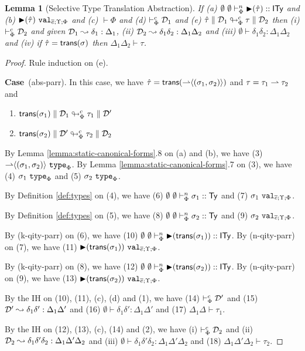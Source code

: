 \documentclass[12pt]{article}
\newtheorem{lemma}{Lemma}
\newcommand{\pfcase}[1]{\textbf{Case}~#1. }
\begin{document}
\begin{lemma}[Selective Type Translation Abstraction]
\label{lemma:selective-type-translation-abstraction}
If (a) $\sofkVX{\sqity{\qity}}{\kity}$ and (b) $\sval{\sqity{\qity}}{\es;\Upsilon;\Phi}$ and (c) $\vdash \Phi$ and (d) $\tytsvX{\memD_1}$ and (e) $\tdeabs{\Phi}{c}{\qity}{\memD_1}{\ity}{\memD_2}$ then (i) $\tytsvX{\memD_2}$ and given $\memD_1 \leadsto \delta_1 : \Delta_1$, (ii) $\memD_2 \leadsto \delta_1\delta_2 : \Delta_1\Delta_2$ and (iii) $\emptyset \vdash \delta_1\delta_2 : \Delta_1\Delta_2$ and (iv) if $\qity=\srep{\st}$ then $\Delta_1\Delta_2 \vdash \tau$.
\end{lemma}
\begin{proof} Rule induction on (e). 

\pfcase{(abs-parr)} In this case, we have $\qity=\srep{\sty{\rightharpoonup}{(\st_1, \st_2)}}$ and $\ity=\iparr{\tau_1}{\tau_2}$ and \begin{enumerate}[(1)]
\item $\tdeabs{\Phi}{c}{\srep{\st_1}}{\memD_1}{\tau_1}{\memD'}$
\item $\tdeabs{\Phi}{c}{\srep{\st_2}}{\memD'}{\tau_2}{\memD_2}$
\end{enumerate}

By Lemma \ref{lemma:static-canonical-forms}.8 on (a) and (b), we have (3) $\istype{\sty{\rightharpoonup}{(\st_1, \st_2)}}{\Phi}$. By Lemma \ref{lemma:static-canonical-forms}.7 on (3), we have (4) $\istype{\st_1}{\Phi}$ and (5) $\istype{\st_2}{\Phi}$.  

By Definition \ref{def:types} on (4), we have (6) $\sofkVX{\st_1}{\kty}$ and (7) $\sval{\st_1}{\es;\Upsilon;\Phi}$.


By Definition \ref{def:types} on (5), we have (8) $\sofkVX{\st_2}{\kty}$ and (9) $\sval{\st_2}{\es;\Upsilon;\Phi}$.

By (k-qity-parr) on (6), we have (10) $\sofkVX{\sqity{\srep{\st_1}}}{\kity}$. By (n-qity-parr) on (7), we have (11) $\sval{\sqity{\srep{\st_1}}}{\es;\Upsilon;\Phi}$.

By (k-qity-parr) on (8), we have (12) $\sofkVX{\sqity{\srep{\st_2}}}{\kity}$. By (n-qity-parr) on (9), we have (13) $\sval{\sqity{\srep{\st_2}}}{\es;\Upsilon;\Phi}$.

By the IH on (10), (11), (c), (d) and (1), we have (14) $\tytsvX{\memD'}$ and (15) $\memD' \leadsto \delta_1\delta' : \Delta_1\Delta'$ and (16) $\emptyset \vdash \delta_1\delta' : \Delta_1\Delta'$ and (17) $\Delta_1\Delta \vdash \tau_1$.

By the IH on (12), (13), (c), (14) and (2), we have (i) $\tytsvX{\memD_2}$ and (ii) $\memD_2 \leadsto \delta_1\delta'\delta_2 : \Delta_1\Delta'\Delta_2$ and (iii) $\emptyset \vdash \delta_1\delta'\delta_2 : \Delta_1\Delta'\Delta_2$ and (18) $\Delta_1\Delta'\Delta_2 \vdash \tau_2$.


\end{proof}
\end{document}

